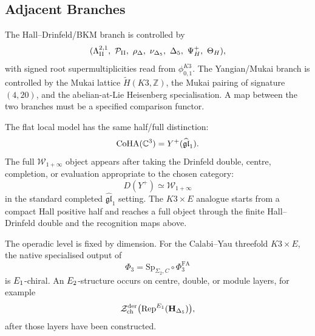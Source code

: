 \subsection{Adjacent Branches}
\label{subsec:adjacent-branches-hdelta}

The Hall--Drinfeld/BKM branch is controlled by
\[
  (\Lambda^{2,1}_{\mathrm{II}},\ \mathcal P_{\mathrm{II}},\ \rho_{\Delta},\
   \nu_{\Delta_5},\ \Delta_5,\ \Psi_H^+,\ \Theta_H),
\]
with signed root supermultiplicities read from \(\phi_{0,1}^{K3}\).
The Yangian/Mukai branch is controlled by the Mukai lattice
\(\widetilde H(K3,\mathbb Z)\), the Mukai pairing of signature
\((4,20)\), and the abelian-at-Lie Heisenberg specialisation.  A map
between the two branches must be a specified comparison functor.

The flat local model has the same half/full distinction:
\[
  \mathrm{CoHA}(\mathbb C^3)=Y^+(\widehat{\mathfrak{gl}}_1).
\]
The full \(\mathcal W_{1+\infty}\) object appears after taking the
Drinfeld double, centre, completion, or evaluation appropriate to the
chosen category:
\[
  D(Y^+)\simeq\mathcal W_{1+\infty}
\]
in the standard completed \(\widehat{\mathfrak{gl}}_1\) setting.  The
\(K3\times E\) analogue starts from a compact Hall positive half and
reaches a full object through the finite Hall--Drinfeld double and the
recognition maps above.

The operadic level is fixed by dimension.  For the Calabi--Yau
threefold \(K3\times E\), the native specialised output of
\[
  \Phi_3
  =
  \mathrm{Sp}_{\Sigma_2,C}\circ\Phi^{\mathrm{FA}}_3
\]
is \(E_1\)-chiral.  An \(E_2\)-structure occurs on centre, double,
or module layers, for example
\[
  \mathcal Z^{\mathrm{der}}_{\mathrm{ch}}
  \bigl(\mathrm{Rep}^{E_1}(\mathbf H_{\Delta_5})\bigr),
\]
after those layers have been constructed.
